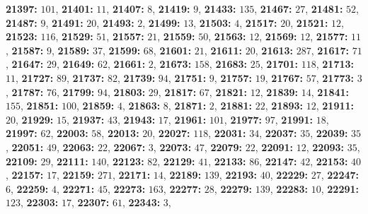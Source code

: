\textsf{\bfseries 21397:} $101$, \textsf{\bfseries 21401:} $11$, \textsf{\bfseries 21407:} $8$, \textsf{\bfseries 21419:} $9$, \textsf{\bfseries 21433:} $135$, \textsf{\bfseries 21467:} $27$, \textsf{\bfseries 21481:} $52$, \textsf{\bfseries 21487:} $9$, \textsf{\bfseries 21491:} $20$, \textsf{\bfseries 21493:} $2$, \textsf{\bfseries 21499:} $13$, \textsf{\bfseries 21503:} $4$, \textsf{\bfseries 21517:} $20$, \textsf{\bfseries 21521:} $12$, \textsf{\bfseries 21523:} $116$, \textsf{\bfseries 21529:} $51$, \textsf{\bfseries 21557:} $21$, \textsf{\bfseries 21559:} $50$, \textsf{\bfseries 21563:} $12$, \textsf{\bfseries 21569:} $12$, \textsf{\bfseries 21577:} $11$, \textsf{\bfseries 21587:} $9$, \textsf{\bfseries 21589:} $37$, \textsf{\bfseries 21599:} $68$, \textsf{\bfseries 21601:} $21$, \textsf{\bfseries 21611:} $20$, \textsf{\bfseries 21613:} $287$, \textsf{\bfseries 21617:} $71$, \textsf{\bfseries 21647:} $29$, \textsf{\bfseries 21649:} $62$, \textsf{\bfseries 21661:} $2$, \textsf{\bfseries 21673:} $158$, \textsf{\bfseries 21683:} $25$, \textsf{\bfseries 21701:} $118$, \textsf{\bfseries 21713:} $11$, \textsf{\bfseries 21727:} $89$, \textsf{\bfseries 21737:} $82$, \textsf{\bfseries 21739:} $94$, \textsf{\bfseries 21751:} $9$, \textsf{\bfseries 21757:} $19$, \textsf{\bfseries 21767:} $57$, \textsf{\bfseries 21773:} $3$, \textsf{\bfseries 21787:} $76$, \textsf{\bfseries 21799:} $94$, \textsf{\bfseries 21803:} $29$, \textsf{\bfseries 21817:} $67$, \textsf{\bfseries 21821:} $12$, \textsf{\bfseries 21839:} $14$, \textsf{\bfseries 21841:} $155$, \textsf{\bfseries 21851:} $100$, \textsf{\bfseries 21859:} $4$, \textsf{\bfseries 21863:} $8$, \textsf{\bfseries 21871:} $2$, \textsf{\bfseries 21881:} $22$, \textsf{\bfseries 21893:} $12$, \textsf{\bfseries 21911:} $20$, \textsf{\bfseries 21929:} $15$, \textsf{\bfseries 21937:} $43$, \textsf{\bfseries 21943:} $17$, \textsf{\bfseries 21961:} $101$, \textsf{\bfseries 21977:} $97$, \textsf{\bfseries 21991:} $18$, \textsf{\bfseries 21997:} $62$, \textsf{\bfseries 22003:} $58$, \textsf{\bfseries 22013:} $20$, \textsf{\bfseries 22027:} $118$, \textsf{\bfseries 22031:} $34$, \textsf{\bfseries 22037:} $35$, \textsf{\bfseries 22039:} $35$, \textsf{\bfseries 22051:} $49$, \textsf{\bfseries 22063:} $22$, \textsf{\bfseries 22067:} $3$, \textsf{\bfseries 22073:} $47$, \textsf{\bfseries 22079:} $22$, \textsf{\bfseries 22091:} $12$, \textsf{\bfseries 22093:} $35$, \textsf{\bfseries 22109:} $29$, \textsf{\bfseries 22111:} $140$, \textsf{\bfseries 22123:} $82$, \textsf{\bfseries 22129:} $41$, \textsf{\bfseries 22133:} $86$, \textsf{\bfseries 22147:} $42$, \textsf{\bfseries 22153:} $40$, \textsf{\bfseries 22157:} $17$, \textsf{\bfseries 22159:} $271$, \textsf{\bfseries 22171:} $14$, \textsf{\bfseries 22189:} $139$, \textsf{\bfseries 22193:} $40$, \textsf{\bfseries 22229:} $27$, \textsf{\bfseries 22247:} $6$, \textsf{\bfseries 22259:} $4$, \textsf{\bfseries 22271:} $45$, \textsf{\bfseries 22273:} $163$, \textsf{\bfseries 22277:} $28$, \textsf{\bfseries 22279:} $139$, \textsf{\bfseries 22283:} $10$, \textsf{\bfseries 22291:} $123$, \textsf{\bfseries 22303:} $17$, \textsf{\bfseries 22307:} $61$, \textsf{\bfseries 22343:} $3$, 
